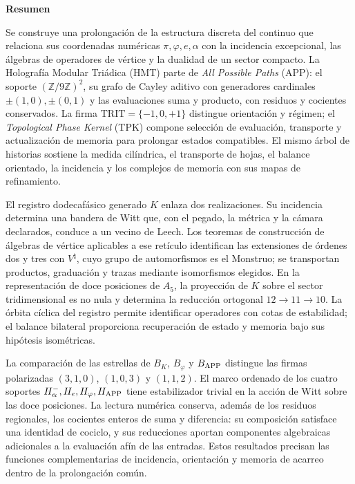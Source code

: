 \begin{center}\textbf{Resumen}\end{center}
\begingroup
\fontsize{9.5}{10.7}\selectfont
\setlength{\parskip}{1.5pt plus .5pt minus .5pt}
\noindent
Se construye una prolongación de la estructura discreta del continuo que
relaciona sus coordenadas numéricas \(\pi,\varphi,e,\alpha\) con la incidencia excepcional, las
álgebras de operadores de vértice y la dualidad de un sector compacto.
La Holografía Modular Triádica (HMT) parte de \emph{All Possible Paths}
(APP): el soporte \((\mathbb Z/9\mathbb Z)^2\), su grafo de Cayley aditivo
con generadores cardinales \(\pm(1,0),\pm(0,1)\) y las evaluaciones suma
y producto, con residuos y cocientes conservados. La firma
\(\mathrm{TRIT}=\{-1,0,+1\}\) distingue orientación y régimen; el
\emph{Topological Phase Kernel} (TPK) compone selección de evaluación,
transporte y actualización de memoria para prolongar estados compatibles.
El mismo árbol de historias sostiene la medida cilíndrica, el transporte
de hojas, el balance orientado, la incidencia y los complejos de memoria
con sus mapas de refinamiento.

El registro dodecafásico generado \(K\) enlaza dos realizaciones.
Su incidencia determina una bandera de Witt que, con el pegado, la métrica
y la cámara declarados, conduce a un vecino de Leech. Los teoremas de
construcción de álgebras de vértice aplicables a ese retículo identifican
las extensiones de órdenes dos y tres con \(V^\natural\), cuyo grupo de
automorfismos es el Monstruo; se transportan productos, graduación y
trazas mediante isomorfismos elegidos. En la representación de doce
posiciones de \(A_5\), la proyección de \(K\) sobre el sector
tridimensional es no nula y determina la reducción ortogonal
\(12\to11\to10\). La órbita cíclica del registro permite identificar
operadores con cotas de estabilidad; el balance bilateral proporciona
recuperación de estado y memoria bajo sus hipótesis isométricas.

La comparación de las estrellas de \(B_K\), \(B_\varphi\) y \(B_{\rm APP}\) distingue
las firmas polarizadas \((3,1,0)\), \((1,0,3)\) y \((1,1,2)\).
El marco ordenado de los cuatro soportes
\(H^-_\alpha,H_e,H_\varphi,H_{\rm APP}\) tiene estabilizador trivial
en la acción de Witt sobre las doce posiciones. La lectura numérica
conserva, además de los residuos regionales, los cocientes enteros de
suma y diferencia: su composición satisface una identidad de cociclo,
y sus reducciones aportan componentes algebraicas adicionales a la
evaluación afín de las entradas. Estos resultados precisan las
funciones complementarias de incidencia, orientación y memoria de
acarreo dentro de la prolongación común.

